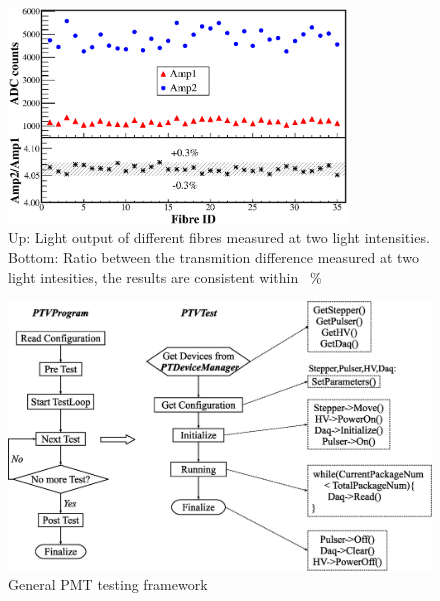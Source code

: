 \documentclass[5p, times]{elsarticle}
\begin{document}


\begin{figure}
 \centering
 \includegraphics[width=90mm]{fibre_diff}
\caption{Up: Light output of different fibres measured at two light intensities.
Bottom: Ratio between the transmition difference measured at two light intesities, the results are consistent within \SI{}{\percent}}
\label{fig:fibre_diff}
\end{figure} 

\begin{figure}
  \centering
 \includegraphics[width=120mm]{software_framework}
\caption{General PMT testing framework}
\label{fig:software_framework}
\end{figure}
\end{document}
